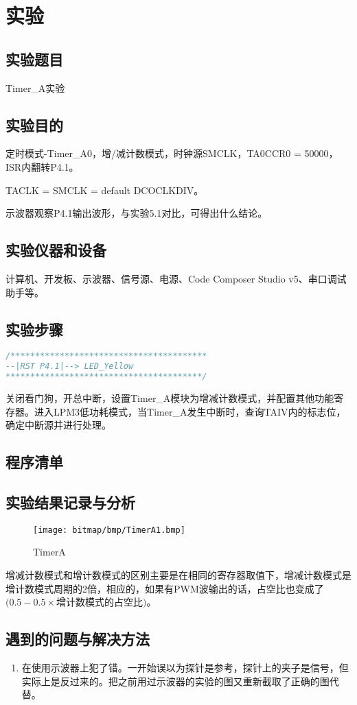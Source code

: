 ﻿%
\section{实验}
\subsection{实验题目}
Timer\_A实验
\subsection{实验目的}
定时模式-Timer\_A0，增/减计数模式，时钟源SMCLK，TA0CCR0 = 50000，ISR内翻转P4.1。
\par\indent TACLK = SMCLK = default DCOCLKDIV。
\par\indent 示波器观察P4.1输出波形，与实验5.1对比，可得出什么结论。
\subsection{实验仪器和设备}
计算机、开发板、示波器、信号源、电源、Code Composer Studio v5、串口调试助手等。
\subsection{实验步骤}
\begin{lstlisting}[language=C]
/****************************************
--|RST P4.1|--> LED_Yellow
****************************************/
\end{lstlisting}
\par\indent 关闭看门狗，开总中断，设置Timer\_A模块为增减计数模式，并配置其他功能寄存器。进入LPM3低功耗模式，当Timer\_A发生中断时，查询TAIV内的标志位，确定中断源并进行处理。
\subsection{程序清单}

\clearpage
\subsection{实验结果记录与分析}
\begin{figure}[htbp]
	\centering
	\caption{TimerA}
	\label{TimerA1}
	\texttt{[image: bitmap/bmp/TimerA1.bmp]}
\end{figure}
\par\indent 增减计数模式和增计数模式的区别主要是在相同的寄存器取值下，增减计数模式是增计数模式周期的2倍，相应的，如果有PWM波输出的话，占空比也变成了\((0.5-0.5\times\)增计数模式的占空比\()\)。
\subsection{遇到的问题与解决方法}
\begin{enumerate}
	\item 在使用示波器上犯了错。一开始误以为探针是参考，探针上的夹子是信号，但实际上是反过来的。把之前用过示波器的实验的图又重新截取了正确的图代替。
\end{enumerate}

